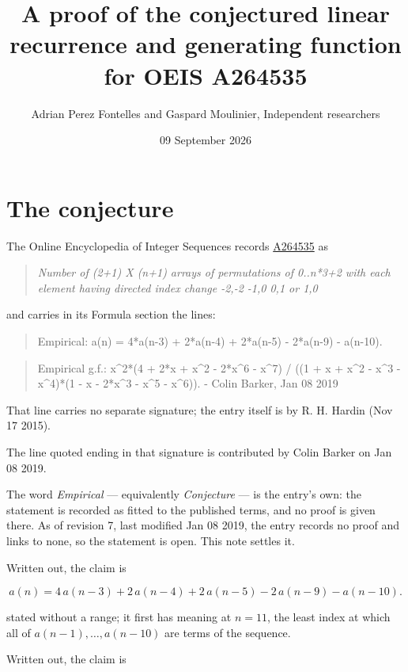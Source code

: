 \documentclass[11pt]{article}
\title{A proof of the conjectured linear recurrence and generating function for OEIS A264535}
\author{Adrian Perez Fontelles and Gaspard Moulinier, Independent researchers}
\date{09 September 2026}
\theoremstyle{definition}
\begin{document}
\maketitle
\section{The conjecture}

The Online Encyclopedia of Integer Sequences records \href{https://oeis.org/A264535}{A264535} as

\begin{quote}\itshape Number of (2+1) X (n+1) arrays of permutations of 0..n*3+2 with each element having directed index change -2,-2 -1,0 0,1 or 1,0\end{quote}

and carries in its Formula section the lines:

\begin{quote}\ttfamily Empirical: a(n) = 4*a(n-3) + 2*a(n-4) + 2*a(n-5) - 2*a(n-9) - a(n-10).\end{quote}

\begin{quote}\ttfamily Empirical g.f.: x\textasciicircum{}2*(4 + 2*x + x\textasciicircum{}2 - 2*x\textasciicircum{}6 - x\textasciicircum{}7) / ((1 + x + x\textasciicircum{}2 - x\textasciicircum{}3 - x\textasciicircum{}4)*(1 - x - 2*x\textasciicircum{}3 - x\textasciicircum{}5 - x\textasciicircum{}6)). - Colin Barker, Jan 08 2019\end{quote}

That line carries no separate signature; the entry itself is by R. H. Hardin (Nov 17 2015).

The line quoted ending in that signature is contributed by Colin Barker on Jan 08 2019.

The word {\itshape Empirical} --- equivalently {\itshape Conjecture} --- is the entry's own: the statement is recorded as fitted to the published terms, and no proof is given there. As of revision 7, last modified Jan 08 2019, the entry records no proof and links to none, so the statement is open. This note settles it.

Written out, the claim is

\[a(n) = 4\,a(n-3) + 2\,a(n-4) + 2\,a(n-5) - 2\,a(n-9) - a(n-10).\]

stated without a range; it first has meaning at $n = 11$, the least index at which all of $a(n-1),\dots,a(n-10)$ are terms of the sequence.

Written out, the claim is
\end{document}
